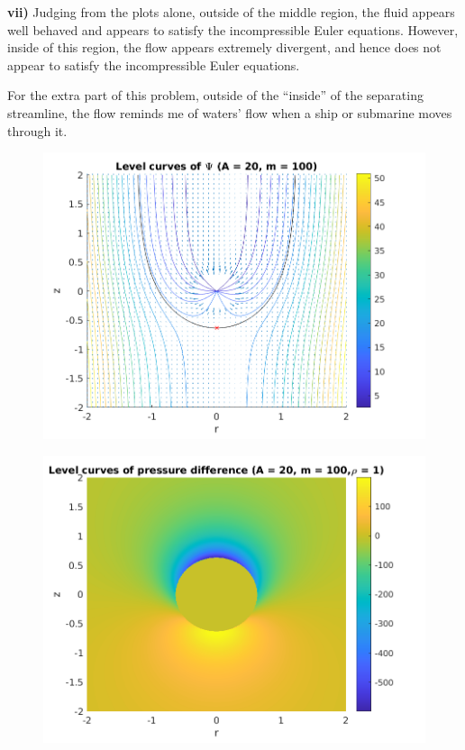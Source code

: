 \documentclass{article}
\begin{document}
\textbf{vii)} Judging from the plots alone, outside of the middle
region, the fluid appears well behaved and appears to satisfy the
incompressible Euler equations. However, inside of this region,
the flow appears extremely divergent, and hence does not appear to
satisfy the incompressible Euler equations.

For the extra part of this problem, outside of the ``inside'' of the
separating streamline, the flow reminds me of waters' flow when a
ship or submarine moves through it.

\newpage

\begin{figure}
    \includegraphics[width=\textwidth]{fig1}
    \centering
\end{figure}

\newpage

\begin{figure}
    \includegraphics[width=\textwidth]{fig2}
    \centering
\end{figure}
\end{document}
